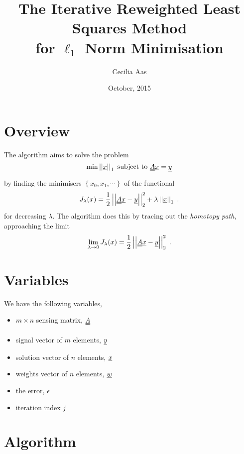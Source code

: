 \documentclass[11pt]{article} %
\title{The Iterative Reweighted Least Squares Method\\ for $\ell_1$ Norm Minimisation}
\author{Cecilia Aas}
\date{October, 2015}
\begin{document}
\maketitle
\section{Overview}
The algorithm aims to solve the problem
\begin{equation}
\label{eq:l1min}
\min\left|\left| \uline{x} \right| \right|_1 \text{ subject to } \uuline{A}\uline{x} = \uline{y}
\end{equation}
by finding the minimisers $\left\{x_0, x_1, \cdots \right\}$ of the functional
\begin{equation}
J_{\lambda}(x) = \frac{1}{2} \left| \left|\uuline{A} \uline{x} - \uline{y} \right| \right|_2^2 + \lambda \left| \left| \uline{x} \right| \right|_1 \; .
\end{equation}
for decreasing $\lambda$.  The algorithm does this by tracing out the \textit{homotopy path}, approaching the limit
\begin{equation}
\lim_{\lambda \rightarrow 0} J_{\lambda}(x) = \frac{1}{2} \left| \left|\uuline{A} \uline{x} - \uline{y} \right| \right|_2^2 \; .
\end{equation}

\section{Variables}
We have the following variables,
\begin{itemize}
\item $m \times n$ sensing matrix, $\uuline{A}$
\item signal vector of $m$ elements, $\uline{y}$
\item solution vector of $n$ elements, $\uline{x}$
\item weights vector of $n$ elements, $\uline{w}$
\item the error, $\epsilon$
\item iteration index $j$
\end{itemize}

\section{Algorithm}
\end{document}
